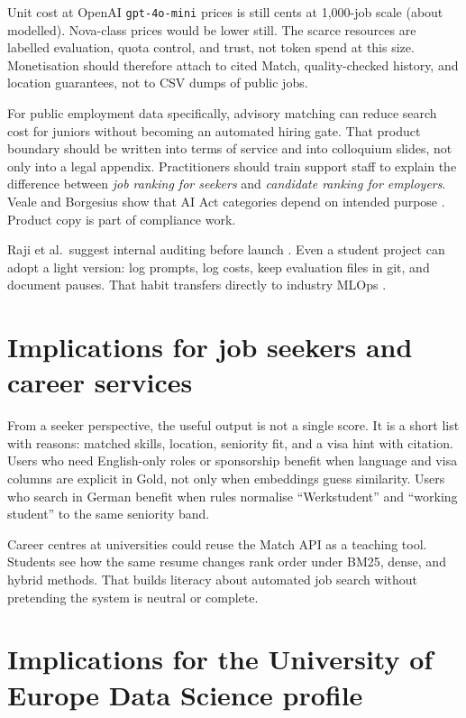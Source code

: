 Unit cost at OpenAI \texttt{gpt-4o-mini} prices is still cents at 1{,}000-job scale (about  modelled). Nova-class prices would be lower still. The scarce resources are labelled evaluation, quota control, and trust, not token spend at this size. Monetisation should therefore attach to cited Match, quality-checked history, and location guarantees, not to CSV dumps of public jobs.

For public employment data specifically, advisory matching can reduce search cost for juniors without becoming an automated hiring gate. That product boundary should be written into terms of service and into colloquium slides, not only into a legal appendix. Practitioners should train support staff to explain the difference between \emph{job ranking for seekers} and \emph{candidate ranking for employers}. Veale and Borgesius show that AI Act categories depend on intended purpose . Product copy is part of compliance work.

Raji et al.\ suggest internal auditing before launch . Even a student project can adopt a light version: log prompts, log costs, keep evaluation files in git, and document pauses. That habit transfers directly to industry MLOps .

\section{Implications for job seekers and career services}
\label{sec:seeker-impl}

From a seeker perspective, the useful output is not a single score. It is a short list with reasons: matched skills, location, seniority fit, and a visa hint with citation. Users who need English-only roles or sponsorship benefit when language and visa columns are explicit in Gold, not only when embeddings guess similarity. Users who search in German benefit when rules normalise ``Werkstudent'' and ``working student'' to the same seniority band.

Career centres at universities could reuse the Match API as a teaching tool. Students see how the same resume changes rank order under BM25, dense, and hybrid methods. That builds literacy about automated job search without pretending the system is neutral or complete.

\section{Implications for the University of Europe Data Science profile}
\label{sec:ue-impl}

